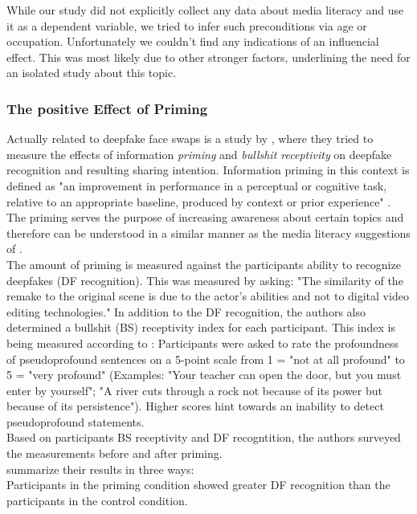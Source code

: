 \documentclass[
  a4paper,  %
  twoside,  %
  bibliography=totoc,
  headsepline,
  cleardoublepage=empty,
  parskip=half,
  draft=false
]{scrbook}
\begin{document}
While our study did not explicitly collect any data about media literacy and use it as a dependent variable, we tried to infer such preconditions via age or occupation. Unfortunately we couldn't find any indications of an influencial effect. This was most likely due to other stronger factors, underlining the need for an isolated study about this topic.

\subsubsection*{The positive Effect of Priming}
Actually related to deepfake face swaps is a study by \citeauthor{iacobucciDeepfakesUnmaskedEffects2021}, where they tried to measure the effects of information \textit{priming} and \textit{bullshit receptivity} on deepfake recognition and resulting sharing intention. Information priming in this context is defined as "an improvement in performance in a perceptual or cognitive task, relative to an appropriate baseline, produced by context or prior experience" \cite{iacobucciDeepfakesUnmaskedEffects2021}. The priming serves the purpose of increasing awareness about certain topics and therefore can be understood in a similar manner as the media literacy suggestions of \citeauthor{hwangEffectsDisinformationUsing2021}. \\
The amount of priming is measured against the participants ability to recognize deepfakes (DF recognition). This was measured by asking: "The similarity of the remake to the original scene is due to the actor's abilities and not to digital video editing technologies." In addition to the DF recognition, the authors also determined a bullshit (BS) receptivity index for each participant. This index is being measured according to \cite{pennycookReceptionDetectionPseudoprofound2015}: Participants were asked to rate the profoundness of pseudoprofound sentences on a 5-point scale from 1 = "not at all profound" to 5 = "very profound" (Examples: "Your teacher can open the door, but you must enter by yourself"; "A river cuts through a rock not because of its power but because of its persistence"). Higher scores hint towards an inability to detect pseudoprofound statements. \\
Based on participants BS receptivity and DF recogntition, the authors surveyed the measurements before and after priming. \\
\citeauthor{iacobucciDeepfakesUnmaskedEffects2021} summarize their results in three ways: \\
Participants in the priming condition showed greater DF recognition than the participants in the control condition. \\
\end{document}
